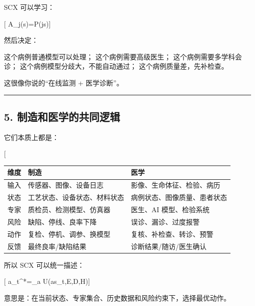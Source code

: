 \documentclass[
  12pt,
]{ctexart}
\newenvironment{Shaded}{}{}
\newcommand{\NormalTok}[1]{#1}
\begin{document}
SCX 可以学习：

{[} A\_j(s)=P(js){]}

然后决定：

\begin{Shaded}
\begin{Highlighting}[]
\NormalTok{这个病例普通模型可以处理；}
\NormalTok{这个病例需要高级医生；}
\NormalTok{这个病例需要多学科会诊；}
\NormalTok{这个病例模型分歧大，不能自动通过；}
\NormalTok{这个病例质量差，先补检查。}
\end{Highlighting}
\end{Shaded}

这很像你说的``在线监测 + 医学诊断''。

\begin{center}\rule{0.5\linewidth}{0.5pt}\end{center}

\subsection{5.
制造和医学的共同逻辑}\label{ux5236ux9020ux548cux533bux5b66ux7684ux5171ux540cux903bux8f91}

它们本质上都是：

{[}  \rightarrow {}
\rightarrow \text{动作调度}{]}

\begin{longtable}[]{@{}lll@{}}
\toprule\noalign{}
维度 & 制造 & 医学 \\
\midrule\noalign{}
\endhead
\bottomrule\noalign{}
\endlastfoot
输入 & 传感器、图像、设备日志 & 影像、生命体征、检验、病历 \\
状态 & 工艺状态、设备状态、材料状态 & 病例状态、图像质量、患者状态 \\
专家 & 质检员、检测模型、仿真器 & 医生、AI 模型、检验系统 \\
风险 & 缺陷、停线、良率下降 & 误诊、漏诊、过度报警 \\
动作 & 复检、停机、调参、换模型 & 复核、补检查、转诊、预警 \\
反馈 & 最终良率/缺陷结果 & 诊断结果/随访/医生确认 \\
\end{longtable}

所以 SCX 可以统一描述：

{[} a\_t\^{}*=\arg\max\_a
U(a\mid s\_t,\mathcal E,\mathcal D,\mathcal H){]}

意思是：在当前状态、专家集合、历史数据和风险约束下，选择最优动作。
\end{document}
